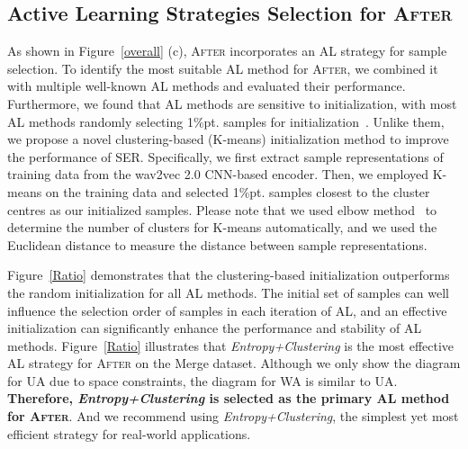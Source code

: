 \documentclass{article}
\begin{document}
\subsection{Active Learning Strategies Selection for \textsc{After}}
\label{Active_learning_results}



As shown in Figure~\ref{overall} (c), \textsc{After} incorporates an AL strategy for sample selection. To identify the most suitable AL method for \textsc{After}, we combined it with multiple well-known AL methods and evaluated their performance. Furthermore, we found that AL methods are sensitive to initialization, with most AL methods randomly selecting 1\%pt. samples for initialization~\cite{MargatinaVBA21}. Unlike them, we propose a novel clustering-based (K-means) initialization method to improve the performance of SER.
Specifically, we first extract sample representations of training data from the wav2vec 2.0 CNN-based encoder. Then, we employed K-means on the training data and selected 1\%pt. samples closest to the cluster centres as our initialized samples. Please note that we used elbow method~\cite{DBLP:journals/cin/SammoudaE21} to determine the number of clusters for K-means automatically, and we used the Euclidean distance to measure the distance between sample representations.


Figure~\ref{Ratio} demonstrates that the clustering-based initialization outperforms the random initialization for all AL methods. 
The initial set of samples can well influence the selection order of samples in each iteration of AL, and an effective initialization can significantly enhance the performance and stability of AL methods. 
Figure~\ref{Ratio} illustrates that \textit{Entropy+Clustering} is the most effective AL strategy for \textsc{After} on the Merge dataset. 
Although we only show the diagram for UA due to space constraints, the diagram for WA is similar to UA.
\textbf{Therefore, \textit{Entropy+Clustering} is selected as the primary AL method for \textsc{After}}. 
And we recommend using \textit{Entropy+Clustering}, the simplest yet most efficient strategy for real-world applications.
\end{document}
